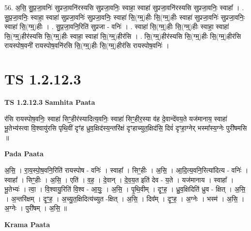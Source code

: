 \documentclass[17pt]{extarticle}
\begin{document}
56. अ॒सि॒ सु॒प्र॒जा॒वनिः॑ सुप्रजा॒वनि॑रस्यसि सुप्रजा॒वनिः॒ स्वाहा॒ स्वाहा॑ सुप्रजा॒वनि॑रस्यसि सुप्रजा॒वनिः॒ स्वाहा᳚ । . सु॒प्र॒जा॒वनिः॒ स्वाहा॒ स्वाहा॑ सुप्रजा॒वनिः॑ सुप्रजा॒वनिः॒ स्वाहा॑ सि॒(ग्म्॒)हीः सि॒(ग्म्॒)हीः स्वाहा॑ सुप्रजा॒वनिः॑ सुप्रजा॒वनिः॒ स्वाहा॑ सि॒(ग्म्॒)हीः । . सु॒प्र॒जा॒वनि॒रिति॑ सुप्रजा - वनिः॑ । . स्वाहा॑ सि॒(ग्म्॒)हीः सि॒(ग्म्॒)हीः स्वाहा॒ स्वाहा॑ सि॒(ग्म्॒)हीर॑स्यसि सि॒(ग्म्॒)हीः स्वाहा॒ स्वाहा॑ सि॒(ग्म्॒)हीर॑सि । . सि॒(ग्म्॒)हीर॑स्यसि सि॒(ग्म्॒)हीः सि॒(ग्म्॒)हीर॑सि रायस्पोष॒वनी॑ रायस्पोष॒वनि॑रसि सि॒(ग्म्॒)हीः सि॒(ग्म्॒)हीर॑सि रायस्पोष॒वनिः॑ । \newline
\pagebreak
{}
\section*{ TS 1.2.12.3 }

\textbf{TS 1.2.12.3 } \newline
\textbf{Samhita Paata} \newline

र॑सि रायस्पोष॒वनिः॒ स्वाहा॑ सिꣳ॒॒हीर॑स्यादित्य॒वनिः॒ स्वाहा॑ सिꣳ॒॒हीर॒स्या व॑ह दे॒वान्दे॑वय॒ते यज॑मानाय॒ स्वाहा॑ भू॒तेभ्य॑स्त्वा वि॒श्वायु॑रसि पृथि॒वीं दृꣳ॑ह ध्रुव॒क्षिद॑स्य॒न्तरि॑क्षं दृꣳहाच्युत॒क्षिद॑सि॒ दिवं॑ दृꣳहा॒ग्नेर् भस्मा᳚स्य॒ग्नेः पुरी॑षमसि ॥ \newline

\textbf{Pada Paata} \newline

अ॒सि॒ । रा॒य॒स्पो॒ष॒वनि॒रिति॑ रायस्पोष - वनिः॑ । स्वाहा᳚ । सिꣳ॒॒हीः । अ॒सि॒ । आ॒दि॒त्य॒वनि॒रित्या॑दित्य - वनिः॑ । स्वाहा᳚ । सिꣳ॒॒हीः । अ॒सि॒ । एति॑ । व॒ह॒ । दे॒वान् । दे॒व॒य॒त इति॑ देव - य॒ते । यज॑मानाय । स्वाहा᳚ । भू॒तेभ्यः॑ । त्वा॒ । वि॒श्वायु॒रिति॑ वि॒श्व - आ॒युः॒ । अ॒सि॒ । पृ॒थि॒वीम् । दृꣳ॒॒ह॒ । ध्रु॒व॒क्षिदिति॑ ध्रुव - क्षित् । अ॒सि॒ । अ॒न्तरि॑क्षम् । दृꣳ॒॒ह॒ । अ॒च्यु॒त॒क्षिदित्य॑च्युत -क्षित् । अ॒सि॒ । दिव᳚म् । दृꣳ॒॒ह॒ । अ॒ग्नेः । भस्म॑ । अ॒सि॒ । अ॒ग्नेः । पुरी॑षम् । अ॒सि॒ ॥  \newline


\textbf{Krama Paata} \newline
\end{document}

